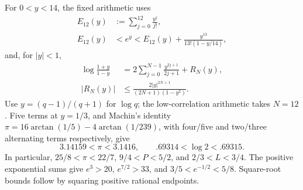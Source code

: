 For \(0<y<14\), the fixed arithmetic uses
\begin{align*}
 E_{12}(y)&:=\sum_{j=0}^{12}\frac{y^j}{j!},\\
 E_{12}(y)&<e^y<E_{12}(y)+\frac{y^{13}}{13!(1-y/14)},
\end{align*}
and, for \(|y|<1\),
\begin{align*}
 \log\frac{1+y}{1-y}
 &=2\sum_{j=0}^{N-1}\frac{y^{2j+1}}{2j+1}+R_N(y),\\
 |R_N(y)|&\le\frac{2|y|^{2N+1}}{(2N+1)(1-y^2)}.
\end{align*}
Use \(y=(q-1)/(q+1)\) for \(\log q\); the low-correlation
arithmetic takes \(N=12\). Five terms at \(y=1/3\), and Machin's identity
\(\pi=16\arctan(1/5)-4\arctan(1/239)\), with four/five and
two/three alternating terms respectively, give
\[
                 3.14159<\pi<3.1416,\qquad .69314<\log2<.69315.
\]
In particular,
\(25/8<\pi<22/7\), \(9/4<P<5/2\), and
\(2/3<L<3/4\). The positive exponential sums give
\(e^3>20\), \(e^{7/2}>33\), and
\(3/5<e^{-1/2}<5/8\).
Square-root bounds follow by squaring positive rational endpoints.
